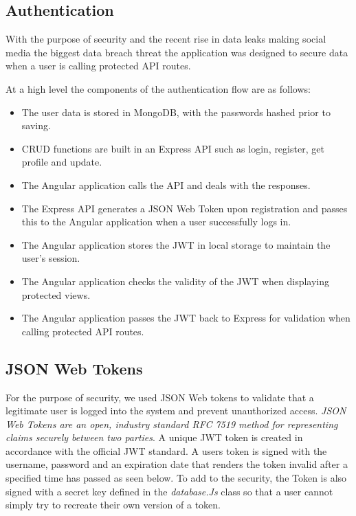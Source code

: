 \subsection{Authentication}
With the purpose of security and the recent rise in data leaks making social media the biggest data breach threat \cite{dataleaks} the application was designed to secure data when a user is calling protected API routes.

At a high level the components of the authentication flow are as follows:
\begin{itemize}
    \item The user data is stored in MongoDB, with the passwords hashed prior to saving.
    \item CRUD functions are built in an Express API such as login, register, get profile and update. 
    \item The Angular application calls the API and deals with the responses.
    \item The Express API generates a JSON Web Token upon registration and passes this to the Angular application when a user successfully logs in.
    \item The Angular application stores the JWT in local storage to maintain the user’s session.
    \item The Angular application checks the validity of the JWT when displaying protected views.
    \item The Angular application passes the JWT back to Express for validation when calling protected API routes.
\end{itemize}
   

\subsection{JSON Web Tokens}
For the purpose of security, we used JSON Web tokens to validate that a legitimate user is logged into the system and prevent unauthorized access. \textit{JSON Web Tokens are an open, industry standard RFC 7519 method for representing claims securely between two parties}\cite{jwt}. A unique JWT token is created in accordance with the official JWT standard. A users token is signed with the username, password and an expiration date that renders the token invalid after a specified time has passed as seen below. To add to the security, the Token is also signed with a secret key defined in the \textit{database.Js} class so that a user cannot simply try to recreate their own version of a token.

